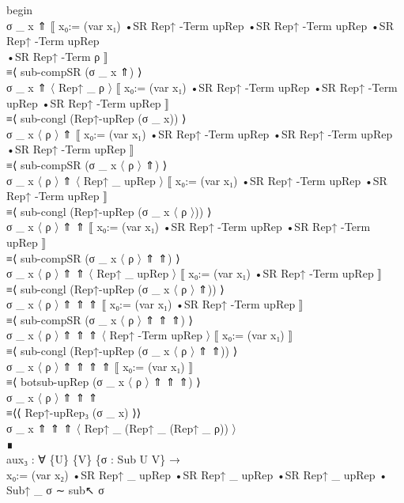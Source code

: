 {\begin{code}
{\>      begin\<\\
\>        σ \_ x ⇑ ⟦ x₀:= (var x₁) •SR Rep↑ -Term upRep •SR Rep↑ -Term upRep •SR\<\\
\>       Rep↑ -Term upRep\<\\
\>       •SR Rep↑ -Term ρ ⟧\<\\
\>      ≡⟨ sub-compSR (σ \_ x ⇑) ⟩\<\\
\>        σ \_ x ⇑ 〈 Rep↑ \_ ρ 〉 ⟦ x₀:= (var x₁) •SR Rep↑ -Term upRep •SR Rep↑ -Term upRep •SR Rep↑ -Term upRep ⟧\<\\
\>      ≡⟨ sub-congl (Rep↑-upRep (σ \_ x)) ⟩\<\\
\>        σ \_ x 〈 ρ 〉 ⇑ ⟦ x₀:= (var x₁) •SR Rep↑ -Term upRep •SR Rep↑ -Term upRep •SR Rep↑ -Term upRep ⟧\<\\
\>      ≡⟨ sub-compSR (σ \_ x 〈 ρ 〉 ⇑) ⟩\<\\
\>        σ \_ x 〈 ρ 〉 ⇑ 〈 Rep↑ \_ upRep 〉 ⟦ x₀:= (var x₁) •SR Rep↑ -Term upRep •SR Rep↑ -Term upRep ⟧\<\\
\>      ≡⟨ sub-congl (Rep↑-upRep (σ \_ x 〈 ρ 〉)) ⟩\<\\
\>        σ \_ x 〈 ρ 〉 ⇑ ⇑ ⟦ x₀:= (var x₁) •SR Rep↑ -Term upRep •SR Rep↑ -Term upRep ⟧\<\\
\>      ≡⟨ sub-compSR (σ \_ x 〈 ρ 〉 ⇑ ⇑) ⟩\<\\
\>        σ \_ x 〈 ρ 〉 ⇑ ⇑ 〈 Rep↑ \_ upRep 〉 ⟦ x₀:= (var x₁) •SR Rep↑ -Term upRep ⟧\<\\
\>      ≡⟨ sub-congl (Rep↑-upRep (σ \_ x 〈 ρ 〉 ⇑)) ⟩\<\\
\>        σ \_ x 〈 ρ 〉 ⇑ ⇑ ⇑ ⟦ x₀:= (var x₁) •SR Rep↑ -Term upRep ⟧\<\\
\>      ≡⟨ sub-compSR (σ \_ x 〈 ρ 〉 ⇑ ⇑ ⇑) ⟩\<\\
\>        σ \_ x 〈 ρ 〉 ⇑ ⇑ ⇑ 〈 Rep↑ -Term upRep 〉 ⟦ x₀:= (var x₁) ⟧\<\\
\>      ≡⟨ sub-congl (Rep↑-upRep (σ \_ x 〈 ρ 〉 ⇑ ⇑)) ⟩\<\\
\>        σ \_ x 〈 ρ 〉 ⇑ ⇑ ⇑ ⇑ ⟦ x₀:= (var x₁) ⟧\<\\
\>      ≡⟨ botsub-upRep (σ \_ x 〈 ρ 〉 ⇑ ⇑ ⇑) ⟩\<\\
\>        σ \_ x 〈 ρ 〉 ⇑ ⇑ ⇑\<\\
\>      ≡⟨⟨ Rep↑-upRep₃ (σ \_ x) ⟩⟩\<\\
\>        σ \_ x ⇑ ⇑ ⇑ 〈 Rep↑ \_ (Rep↑ \_ (Rep↑ \_ ρ)) 〉\<\\
\>      ∎\<\\
\>    aux₃ : ∀ \{U\} \{V\} \{σ : Sub U V\} → \<\\
\>        x₀:= (var x₂) •SR Rep↑ \_ upRep •SR Rep↑ \_ upRep •SR Rep↑ \_ upRep • Sub↑ \_ σ ∼ sub↖ σ\<\\
}
\end{code}}
